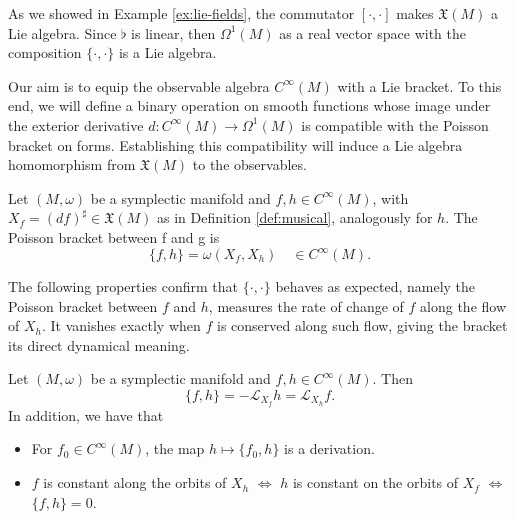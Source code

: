 \noindent As we showed in Example \ref{ex:lie-fields}, the commutator $[ \cdot , \cdot ]$ makes $\mathfrak{X}(M)$ a Lie algebra. Since $\flat$ is linear, then $\Omega^1(M)$ as a real vector space with the composition $\{\cdot ,\cdot\}$ is a Lie algebra.

\noindent Our aim is to equip the observable algebra $C^\infty(M)$ with a Lie bracket. To this end, we will define a binary operation on smooth functions whose image under the exterior derivative $d: C^\infty(M) \to \Omega^1(M)$ is compatible with the Poisson bracket on forms. Establishing this compatibility will induce a Lie algebra homomorphism from $\mathfrak{X}(M)$ to the observables.

\begin{definition}\label{def:poi-fun}
	Let $(M, \omega)$ be a symplectic manifold and $f,h \in C^\infty(M)$, with $X_f = (df)^\sharp \in \mathfrak{X}(M)$ as in Definition \ref{def:musical}, analogously for $h$. The Poisson bracket between f and g is
	\[
		\{ f,h \} = \omega(X_f, X_h) \quad \in C^\infty(M).
	\]
\end{definition}

The following properties confirm that $\{\cdot, \cdot\}$ behaves as expected, namely the Poisson bracket between $f$ and $h$, measures the rate of change of $f$ along the flow of $X_h$. It vanishes exactly when $f$ is conserved along such flow, giving the bracket its direct dynamical meaning.

\begin{proposition}\label{prop:poi-prop}
	Let $(M, \omega)$ be a symplectic manifold and $f, h \in C^\infty(M)$. Then
	\[
	\{f, h\} = - \mathscr{L}_{X_f} h = \mathscr{L}_{X_h} f.
	\]
	In addition, we have that 
	\begin{itemize}
		
		\item[(i)] For $f_0 \in C^\infty(M)$, the map $h \mapsto \{f_0, h\}$ is a derivation.
		
		\item[(ii)] $f$ is constant along the orbits of $X_h$ $\iff$ $h$ is constant on the orbits of $X_f$ $\iff$ $\{f, h\} = 0$.
	\end{itemize}
\end{proposition}

